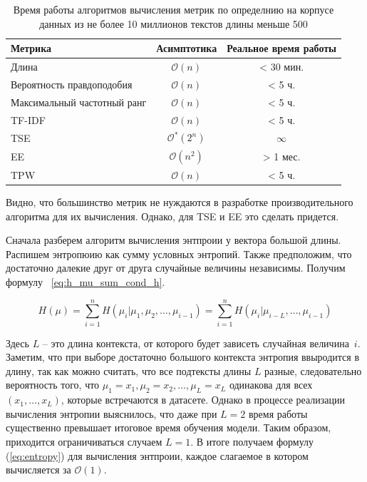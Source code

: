 \documentclass{spbau-diploma}
\begin{document}
\begin{table}[h]
	\label{table:def_metrics_asymptotics}
	\caption{Время работы алгоритмов вычисления метрик по определнию на корпусе данных из не более 10 миллионов текстов длины меньше 500}
	\centering
	\begin{tabular}{|l|c|c|}
		\hline
		Метрика & Асимптотика & Реальное время работы \\
		\hline
		Длина & $\mathcal{O}(n)$ & < 30 мин. \\
		Вероятность правдоподобия & $\mathcal{O}(n)$ & < 5 ч.\\
		Максимальный частотный ранг & $\mathcal{O}(n)$ & < 5 ч. \\
		\hline
		TF-IDF & $\mathcal{O}(n)$ & < 5 ч. \\
		\hline
		TSE & $\mathcal{O}^*(2^n)$ & {\bf $\infty$} \\
		EE & $\mathcal{O}(n^2)$ & > 1 мес. \\
		TPW & $\mathcal{O}(n)$ & < 5 ч. \\
		\hline
	\end{tabular}
\end{table}

Видно, что большинство метрик не нуждаются в разработке производительного алгоритма для их вычисления. Однако, для TSE и EE это сделать придется.

Сначала разберем алгоритм вычисления энтпроии у вектора большой длины. Распишем энтропюию как сумму условных энтропий. Также предположим, что достаточно далекие друг от друга случайные величины независимы. Получим формулу~ \ref{eq:h_mu_sum_cond_h}.

\begin{equation} \label{eq:h_mu_sum_cond_h}
H(\mu) = \sum\limits_{i=1}^{n}H(\mu_i|\mu_1,\mu_2,\ldots,\mu_{i-1}) = \sum\limits_{i=1}^{n}H(\mu_i|\mu_{i-L},\ldots,\mu_{i-1})
\end{equation}

Здесь $L$ -- это длина контекста, от которого будет зависеть случайная величина~$i$. Заметим, что при выборе достаточно большого контекста энтропия ввыродится в длину, так как можно считать, что все подтексты длины $L$ разные, следовательно вероятность того, что $\mu_1=x_1,\mu_2=x_2,\ldots,\mu_L=x_L$ одинакова для всех $(x_1,\ldots,x_L)$, которые встречаются в датасете. Однако в процессе реализации вычисления энтропии выяснилось, что даже при $L = 2$ время работы существенно превышает итоговое время обучения модели. Таким образом, приходится ограничиваться случаем $L=1$. В итоге получаем формулу (\ref{eq:entropy}) для вычисления энтпроии, каждое слагаемое в котором вычисляется за $\mathcal{O}(1)$.
\end{document}
